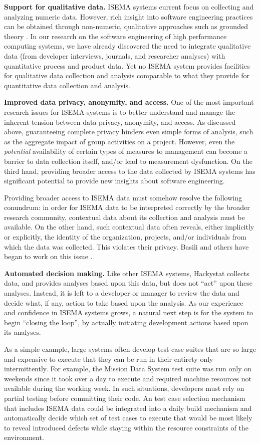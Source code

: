\documentclass[10pt,twocolumn]{article}
\begin{document}
{\bf Support for qualitative data.} ISEMA systems current focus on
collecting and analyzing numeric data.  However, rich insight into software
engineering practices can be obtained through non-numeric, qualitative
approaches such as grounded theory \cite{Seaman??}.  In our research on the
software engineering of high performance computing systems, we have already
discovered the need to integrate qualitative data (from developer
interviews, journals, and researcher analyses) with quantitative process
and product data.  Yet no ISEMA system provides facilities for qualitative
data collection and analysis comparable to what they provide for
quantitative data collection and analysis.

{\bf Improved data privacy, anonymity, and access.}  One of the most
important research issues for ISEMA systems is to better understand and
manage the inherent tension between data privacy, anonymity, and access. As
discussed above, guaranteeing complete privacy hinders even simple forms of
analysis, such as the aggregate impact of group activities on a project.
However, even the {\em potential} availability of certain types of measures
to management can become a barrier to data collection itself, and/or lead
to measurement dysfunction.  On the third hand, providing broader access to
the data collected by ISEMA systems has significant potential to provide
new insights about software engineering.

Providing broader access to ISEMA data must somehow resolve the following
conundrum: in order for ISEMA data to be interpreted correctly by the
broader research community, contextual data about its collection and
analysis must be available.  On the other hand, such contextual data often
reveals, either implicitly or explicitly, the identity of the organization,
projects, and/or individuals from which the data was collected.  This
violates their privacy.  Basili and others have began to work on this issue
\cite{Basili}.

{\bf Automated decision making.}  Like other ISEMA systems, Hackystat
collects data, and provides analyses based upon this data, but does not
``act'' upon these analyses. Instead, it is left to a developer or manager
to review the data and decide what, if any, action to take based upon the
analysis.  As our experience and confidence in ISEMA systems grows, a
natural next step is for the system to begin ``closing the loop'', by
actually initiating development actions based upon its analyses.

As a simple example, large systems often develop test case suites that are
so large and expensive to execute that they can be run in their entirety
only intermittently.  For example, the Mission Data System test suite was
run only on weekends since it took over a day to execute and required
machine resources not available during the working week.  In such
situations, developers must rely on partial testing before committing their
code.  An test case selection mechanism that includes ISEMA data could be
integrated into a daily build mechanism and automatically decide which set
of test cases to execute that would be most likely to reveal introduced
defects while staying within the resource constraints of the environment.
\end{document}
